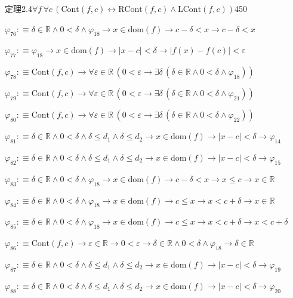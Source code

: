 \begin{fullproof}{定理2.4}{$\forall f\,\forall c\,(\mathrm{Cont}(f,c) \leftrightarrow \mathrm{RCont}(f,c) \land \mathrm{LCont}(f,c))$}{450}
\begin{abbrevlist}
\item $\varphi_{76} :\equiv \delta \in \mathbb{R} \land 0 < \delta \land \varphi_{18} \to x \in \mathrm{dom}(f) \to c - \delta < x \to c - \delta < x$
\item $\varphi_{77} :\equiv \varphi_{18} \to x \in \mathrm{dom}(f) \to \lvert x - c \rvert < \delta \to \lvert f(x) - f(c) \rvert < \varepsilon$
\item $\varphi_{78} :\equiv \mathrm{Cont}(f,c) \to \forall \varepsilon \in \mathbb{R}\,(0 < \varepsilon \to \exists \delta\,(\delta \in \mathbb{R} \land 0 < \delta \land \varphi_{18}))$
\item $\varphi_{79} :\equiv \mathrm{Cont}(f,c) \to \forall \varepsilon \in \mathbb{R}\,(0 < \varepsilon \to \exists \delta\,(\delta \in \mathbb{R} \land 0 < \delta \land \varphi_{21}))$
\item $\varphi_{80} :\equiv \mathrm{Cont}(f,c) \to \forall \varepsilon \in \mathbb{R}\,(0 < \varepsilon \to \exists \delta\,(\delta \in \mathbb{R} \land 0 < \delta \land \varphi_{22}))$
\item $\varphi_{81} :\equiv \delta \in \mathbb{R} \land 0 < \delta \land \delta \leq d_{1} \land \delta \leq d_{2} \to x \in \mathrm{dom}(f) \to \lvert x - c \rvert < \delta \to \varphi_{14}$
\item $\varphi_{82} :\equiv \delta \in \mathbb{R} \land 0 < \delta \land \delta \leq d_{1} \land \delta \leq d_{2} \to x \in \mathrm{dom}(f) \to \lvert x - c \rvert < \delta \to \varphi_{15}$
\item $\varphi_{83} :\equiv \delta \in \mathbb{R} \land 0 < \delta \land \varphi_{18} \to x \in \mathrm{dom}(f) \to c - \delta < x \to x \leq c \to x \in \mathbb{R}$
\item $\varphi_{84} :\equiv \delta \in \mathbb{R} \land 0 < \delta \land \varphi_{18} \to x \in \mathrm{dom}(f) \to c \leq x \to x < c + \delta \to x \in \mathbb{R}$
\item $\varphi_{85} :\equiv \delta \in \mathbb{R} \land 0 < \delta \land \varphi_{18} \to x \in \mathrm{dom}(f) \to c \leq x \to x < c + \delta \to x < c + \delta$
\item $\varphi_{86} :\equiv \mathrm{Cont}(f,c) \to \varepsilon \in \mathbb{R} \to 0 < \varepsilon \to \delta \in \mathbb{R} \land 0 < \delta \land \varphi_{18} \to \delta \in \mathbb{R}$
\item $\varphi_{87} :\equiv \delta \in \mathbb{R} \land 0 < \delta \land \delta \leq d_{1} \land \delta \leq d_{2} \to x \in \mathrm{dom}(f) \to \lvert x - c \rvert < \delta \to \varphi_{19}$
\item $\varphi_{88} :\equiv \delta \in \mathbb{R} \land 0 < \delta \land \delta \leq d_{1} \land \delta \leq d_{2} \to x \in \mathrm{dom}(f) \to \lvert x - c \rvert < \delta \to \varphi_{20}$

\end{abbrevlist}
\end{fullproof}
